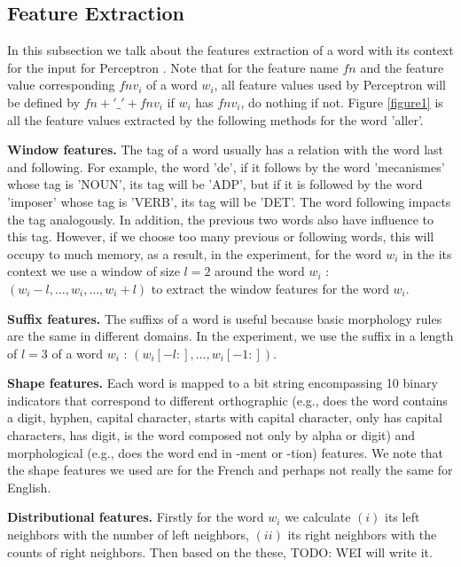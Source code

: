 \documentclass{article}
\begin{document}
\subsection{Feature Extraction}
In this subsection we talk about the features extraction of a word with its context for the input for Perceptron \cite{schnabel2014flors}. Note that for the feature name $fn$ and  the feature value corresponding $fnv_i$ of a word $w_i$, all feature values used by Perceptron will be defined by $fn + '\_' + fnv_i$ if $w_i$ has $fnv_i$, do nothing if not. Figure \ref{figure1} is all the feature values extracted by the following methods for the word 'aller'.

\textbf{Window features.} The tag of a word usually has a relation with the word last and following. For example, the word 'de', if it follows by the word 'mecanismes' whose tag is 'NOUN', its tag will be 'ADP', but if it is followed by the word 'imposer' whose tag is 'VERB', its tag will be 'DET'. The word following impacts the tag analogously. In addition, the previous two words also have influence to this tag. However, if we choose too many previous or following words, this will occupy to much memory, as a result, in the experiment, for the word $w_i$ in the its context we use a window of size $l = 2$ around the word $w_i$ : $(w_i-l,\dots, w_i,\dots, w_i+l )$ to extract the window features for the word $w_i$.

\textbf{Suffix features.} The suffixs of a word is useful because basic morphology rules are the same in different domains. In the experiment, we use the suffix in a length of $l = 3$ of a word $w_i$ : $(w_i[-l:],\dots,w_i[-1:])$. 

\textbf{Shape features.} Each word is mapped to a bit string encompassing 10 binary indicators that correspond to different orthographic (e.g., does the word contains a digit, hyphen, capital character, starts with capital character, only has capital characters, has digit, is the word composed not only by alpha or digit) and morphological (e.g., does the word end in -ment or -tion) features. We note that the shape features we used are for the French and perhaps not really the same for English. 

\textbf{Distributional features.} Firstly for the word $w_i$ we calculate $(i)$ its left neighbors with the number of left neighbors, $(ii)$ its right neighbors with the counts of right neighbors. Then based on the these, TODO: WEI will write it.
\end{document}
